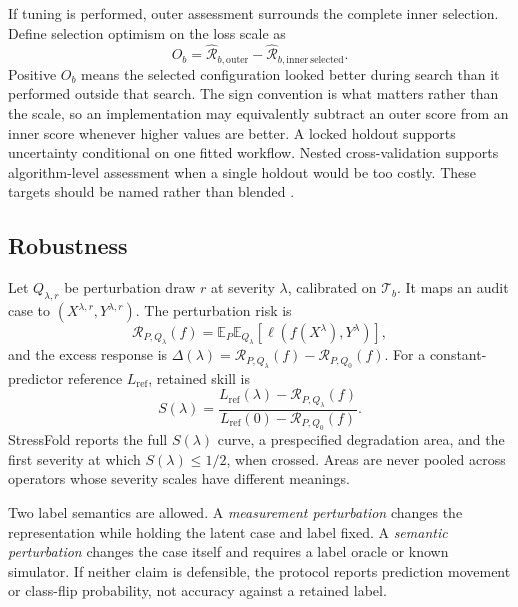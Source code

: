 \documentclass[10pt,twocolumn]{article}
\newcommand{\E}{\mathbb{E}}
\newcommand{\risk}{\mathcal{R}}
\newcommand{\train}{\mathcal{T}}
\newcommand{\loss}{\ell}
\begin{document}
If tuning is performed, outer assessment surrounds the complete inner selection. Define selection optimism on the loss scale as
\begin{equation}
  O_b=\widehat{\risk}_{b,\mathrm{outer}}
      -\widehat{\risk}_{b,\mathrm{inner\ selected}}.
  \label{eq:optimism}
\end{equation}
Positive \(O_b\) means the selected configuration looked better during search than it performed outside that search. The sign convention is what matters rather than the scale, so an implementation may equivalently subtract an outer score from an inner score whenever higher values are better. A locked holdout supports uncertainty conditional on one fitted workflow. Nested cross-validation supports algorithm-level assessment when a single holdout would be too costly. These targets should be named rather than blended \citep{bates2024crossvalidation}.

\subsection{Robustness}

Let \(Q_{\lambda,r}\) be perturbation draw \(r\) at severity \(\lambda\), calibrated on \(\train_b\). It maps an audit case to \((X^{\lambda,r},Y^{\lambda,r})\). The perturbation risk is
\begin{equation}
  \risk_{P,Q_\lambda}(f)
  =\E_{P}\E_{Q_\lambda}
   \left[\loss(f(X^{\lambda}),Y^{\lambda})\right],
  \label{eq:robustness}
\end{equation}
and the excess response is \(\Delta(\lambda)=\risk_{P,Q_\lambda}(f)-\risk_{P,Q_0}(f)\). For a constant-predictor reference \(L_{\mathrm{ref}}\), retained skill is
\begin{equation}
  S(\lambda)=
  \frac{L_{\mathrm{ref}}(\lambda)-\risk_{P,Q_\lambda}(f)}
       {L_{\mathrm{ref}}(0)-\risk_{P,Q_0}(f)}.
  \label{eq:skill}
\end{equation}
StressFold reports the full \(S(\lambda)\) curve, a prespecified degradation area, and the first severity at which \(S(\lambda)\leq 1/2\), when crossed. Areas are never pooled across operators whose severity scales have different meanings.

Two label semantics are allowed. A \emph{measurement perturbation} changes the representation while holding the latent case and label fixed. A \emph{semantic perturbation} changes the case itself and requires a label oracle or known simulator. If neither claim is defensible, the protocol reports prediction movement or class-flip probability, not accuracy against a retained label.
\end{document}
